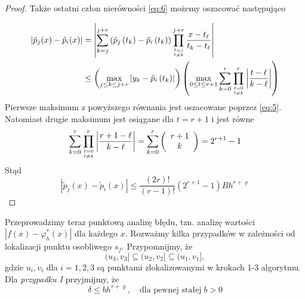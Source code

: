 \documentclass[oik, pdftex, robocza, man]{mgrwms}
\begin{document}
\begin{proof}
        Także ostatni człon nierówności \ref{eq:6} możemy oszacować następująco

        \begin{equation*}
            \begin{aligned}
                \left|\tilde{p}_{j}(x)-\tilde{p}_{i}(x)\right| &=\left|\sum_{k=j}^{j+r}\left(\tilde{p}_{j}\left(t_{k}\right)-\tilde{p}_{i}\left(t_{k}\right)\right) \prod_{\ell=j \atop \ell \neq k}^{j+r} \frac{x-t_{\ell}}{t_{k}-t_{\ell}}\right| \\
                & \leq\left(\max _{j \leq k \leq j+r}\left|y_{k}-\tilde{p}_{i}\left(t_{k}\right)\right|\right)\left(\max _{0 \leq t \leq r+1} \sum_{k=0}^{r} \prod_{\ell=0 \atop \ell \neq k}^{r}\left|\frac{t-\ell}{k-\ell}\right|\right)
            \end{aligned}                
        \end{equation*}
        Pierwsze maksimum z powyższego równania jest oszacowane poprzez \ref{eq:5}. Natomiast drugie maksimum jest osiągane dla $t=r+1$ i jest równe
        \begin{equation*}
            \sum_{k=0}^{r} \prod_{\ell=0 \atop \ell \neq k}^{r}\left|\frac{r+1-\ell}{k-\ell}\right|=\sum_{k=0}^{r}\left(\begin{array}{c} r+1 \\ k\end{array}\right)=2^{r+1}-1
        \end{equation*}
        Stąd
        \begin{equation*}
            \left|\tilde{p}_{j}(x)-\tilde{p}_{i}(x)\right| \leq \frac{(2 r) !}{(r-1) !}\left(2^{r+1}-1\right) B h^{r+\varrho}
        \end{equation*}
    \end{proof}

    Przeprowadzimy teraz punktową analizę błędu, tzn. analizę wartości $|f(x) - \varphi_{h}^{*}(x)|$ dla każdego $x$. Rozważmy kilka przypadków w zależności od lokalizacji punktu osobliwego $s_{f}$. Przypomnijmy, że
    \begin{equation*}
        (u_{3}, v_{3}] \subseteq (u_{2}, v_{2}] \subseteq (u_{1}, v_{1}],
    \end{equation*}
    gdzie $u_{i}, v_{i}$ dla $i=1,2,3$ są punktami zlokalizowanymi w krokach 1-3 algorytmu. Dla \textit{przypadku I} przyjmijmy, że
    \begin{equation} \label{eq:algMP_7}
        \delta \leq bh^{r+\varrho}, \quad \text{dla pewnej stałej}\; b>0
    \end{equation}
\end{document}
